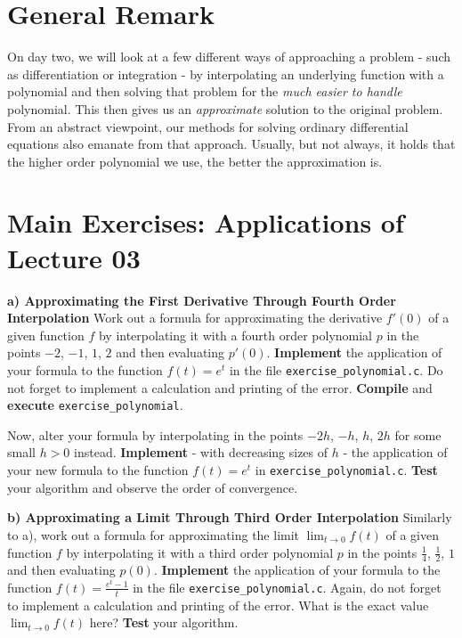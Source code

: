 \documentclass[a4paper]{scrartcl}
\begin{document}
\noindent


\section*{General Remark}

On day two, we will look at a few different ways of approaching a problem - such as differentiation or integration - by interpolating an underlying function with a polynomial and then solving that problem for the \emph{much easier to handle} polynomial. This then gives us an \emph{approximate} solution to the original problem. From an abstract viewpoint, our methods for solving ordinary differential equations also emanate from that approach. Usually, but not always, it holds that the higher order polynomial we use, the better the approximation is.

\section*{Main Exercises: Applications of Lecture 03}

\textbf{a) Approximating the First Derivative Through Fourth Order Interpolation}\newline\newline
Work out a formula for approximating the derivative $f'(0)$ of a given function $f$ by interpolating it with a fourth order polynomial $p$ in the points $-2$, $-1$, $1$, $2$ and then evaluating $p'(0)$. \textbf{Implement} the application of your formula to the function $f(t)=e^{t}$ in the file \texttt{exercise\_polynomial.c}. Do not forget to implement a calculation and printing of the error. \textbf{Compile} and \textbf{execute} \texttt{exercise\_polynomial}.

Now, alter your formula by interpolating in the points $-2h$, $-h$, $h$, $2h$ for some small $h>0$ instead. \textbf{Implement} - with decreasing sizes of $h$ - the application of your new formula to the function $f(t)=e^{t}$ in \texttt{exercise\_polynomial.c}. \textbf{Test} your algorithm and observe the order of convergence.
\newline

\textbf{b) Approximating a Limit Through Third Order Interpolation}\newline\newline 
Similarly to a), work out a formula for approximating the limit $\lim_{t\rightarrow0}f(t)$ of a given function $f$ by interpolating it with a third order polynomial $p$ in the points $\frac{1}{4}$, $\frac{1}{2}$, $1$ and then evaluating $p(0)$. \textbf{Implement} the application of your formula to the function $f(t)=\frac{e^{t}-1}{t}$ in the file \texttt{exercise\_polynomial.c}. Again, do not forget to implement a calculation and printing of the error. What is the exact value $\lim_{t\rightarrow0}f(t)$ here? \textbf{Test} your algorithm.
\end{document}
